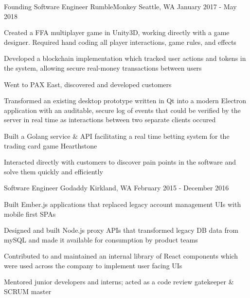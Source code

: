 \begin{cventries}
  \cventry
    {Founding Software Engineer} %
    {RumbleMonkey} %
    {Seattle, WA} %
    {January 2017 - May 2018} %
    {
      \begin{cvitems} %
        \item {Created a FFA multiplayer game in Unity3D, working directly with a game designer. Required hand coding all player interactions, game rules, and effects}
        \item {Developed a blockchain implementation which tracked user actions and tokens in the system, allowing secure real-money transactions between users}
        \item {Went to PAX East, discovered and developed customers}
        \item {Transformed an existing desktop prototype written in Qt into a modern Electron application with an auditable, secure log of events that could be verified by the server in real time as interactions between two separate clients occured}
        \item {Built a Golang service \& API facilitating a real time betting system for the trading card game Hearthstone}
        \item {Interacted directly with customers to discover pain points in the software and solve them quickly and efficiently}
      \end{cvitems}
    }

  \cventry
    {Software Engineer} %
    {Godaddy} %
    {Kirkland, WA} %
    {February 2015 - December 2016} %
    {
      \begin{cvitems} %
        \item {Built Ember.js applications that replaced legacy account management UIs with mobile first SPAs}
        \item {Designed and built Node.js proxy APIs that transformed legacy DB data from mySQL and made it available for consumption by product teams}
        \item {Contributed to and maintained an internal library of React components which were used across the company to implement user facing UIs}
        \item {Mentored junior developers and interns; acted as a code review gatekeeper \& SCRUM master}
      \end{cvitems}
    }


\end{cventries}
